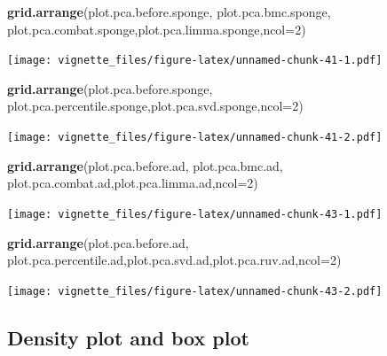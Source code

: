 \documentclass[]{book}
\newenvironment{Shaded}{\begin{snugshade}}{\end{snugshade}}
\newcommand{\KeywordTok}[1]{\textcolor[rgb]{0.13,0.29,0.53}{\textbf{#1}}}
\newcommand{\DataTypeTok}[1]{\textcolor[rgb]{0.13,0.29,0.53}{#1}}
\newcommand{\DecValTok}[1]{\textcolor[rgb]{0.00,0.00,0.81}{#1}}
\newcommand{\NormalTok}[1]{#1}
\begin{document}
\begin{Shaded}
\begin{Highlighting}[]
\KeywordTok{grid.arrange}\NormalTok{(plot.pca.before.sponge, plot.pca.bmc.sponge, plot.pca.combat.sponge,plot.pca.limma.sponge,}\DataTypeTok{ncol=}\DecValTok{2}\NormalTok{)}
\end{Highlighting}
\end{Shaded}

\texttt{[image: vignette\_files/figure-latex/unnamed-chunk-41-1.pdf]}

\begin{Shaded}
\begin{Highlighting}[]
\KeywordTok{grid.arrange}\NormalTok{(plot.pca.before.sponge, plot.pca.percentile.sponge,plot.pca.svd.sponge,}\DataTypeTok{ncol=}\DecValTok{2}\NormalTok{)}
\end{Highlighting}
\end{Shaded}

\texttt{[image: vignette\_files/figure-latex/unnamed-chunk-41-2.pdf]}

\begin{Shaded}
\begin{Highlighting}[]
\KeywordTok{grid.arrange}\NormalTok{(plot.pca.before.ad, plot.pca.bmc.ad, plot.pca.combat.ad,plot.pca.limma.ad,}\DataTypeTok{ncol=}\DecValTok{2}\NormalTok{)}
\end{Highlighting}
\end{Shaded}

\texttt{[image: vignette\_files/figure-latex/unnamed-chunk-43-1.pdf]}

\begin{Shaded}
\begin{Highlighting}[]
\KeywordTok{grid.arrange}\NormalTok{(plot.pca.before.ad, plot.pca.percentile.ad,plot.pca.svd.ad,plot.pca.ruv.ad,}\DataTypeTok{ncol=}\DecValTok{2}\NormalTok{)}
\end{Highlighting}
\end{Shaded}

\texttt{[image: vignette\_files/figure-latex/unnamed-chunk-43-2.pdf]}

\subsection{Density plot and box
plot}\label{density-plot-and-box-plot-1}
\end{document}
